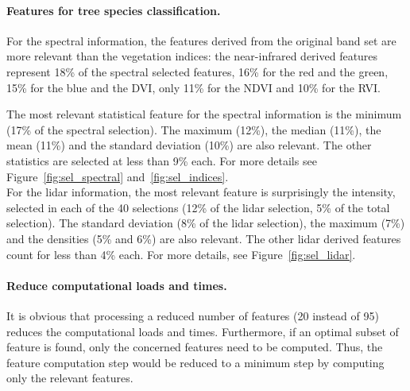 \paragraph{Features for tree species classification. \\}
For the spectral information, the features derived from the original band set are more relevant than the vegetation indices: the near-infrared derived features represent 18\% of the spectral selected features, 16\% for the red and the green, 15\% for the blue and the DVI, only 11\% for the NDVI and 10\% for the RVI. 

The most relevant statistical feature for the spectral information is the minimum (17\% of the spectral selection). The maximum (12\%), the median (11\%), the mean (11\%) and the standard deviation (10\%) are also relevant. The other statistics are selected at less than 9\% each. For more details see Figure~\ref{fig:sel_spectral} and~\ref{fig:sel_indices}. \\

For the lidar information, the most relevant feature is surprisingly the intensity, selected in each of the 40 selections (12\% of the lidar selection, 5\% of the total selection). The standard deviation (8\% of the lidar selection), the maximum (7\%) and the densities (5\% and 6\%) are also relevant. The other lidar derived features count for less than 4\% each. For more details, see Figure~\ref{fig:sel_lidar}.

\paragraph{Reduce computational loads and times. \\}
It is obvious that processing a reduced number of features (20 instead of 95) reduces the computational loads and times. Furthermore, if an optimal subset of feature is found, only the concerned features need to be computed. Thus, the feature computation step would be reduced to a minimum step by computing only the relevant features.



\datalidar

